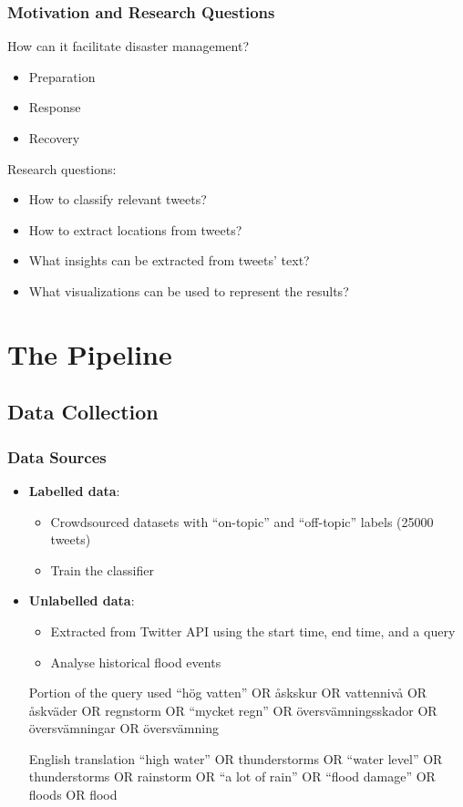 \documentclass{beamer}
\begin{document}
\begin{frame}[t]
  \frametitle{Motivation and Research Questions}
  How can it facilitate disaster management?
  \begin{itemize}
    \item Preparation
    \item Response
    \item Recovery
  \end{itemize}
  \pause
  \vspace{0.5cm}
  Research questions:
  \begin{itemize} 
    \item How to classify relevant tweets?
    \item How to extract locations from tweets?
    \item What insights can be extracted from tweets' text?
    \item What visualizations can be used to represent the results? 
  \end{itemize}

\end{frame}


\section{The Pipeline}
\subsection{Data Collection}
\begin{frame}
  \frametitle{Data Sources}
  \begin{itemize}
    \item \textbf{Labelled data}:  
      \begin{itemize}
        \item Crowdsourced datasets with ``on-topic'' and ``off-topic'' labels (25000 tweets)
        \item Train the classifier
      \end{itemize}
      \pause
    \item \textbf{Unlabelled data}: 
      \begin{itemize}
    \item Extracted from Twitter API using the start time, end time, and a query
    \item Analyse historical flood events
      \end{itemize}
      \begin{block}{Portion of the query used}
        ``hög vatten'' OR åskskur
        OR vattennivå OR åskväder OR regnstorm
        OR ``mycket regn'' OR översvämningsskador
        OR översvämningar OR översvämning
      \end{block}

      \begin{block}{English translation}
        ``high water'' OR thunderstorms
        OR ``water level'' OR thunderstorms OR rainstorm
        OR ``a lot of rain'' OR ``flood damage''
        OR floods OR flood
      \end{block}
  \end{itemize}
\end{frame}
\end{document}
